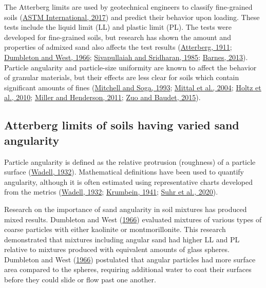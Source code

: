 \documentclass[
  letterpaper,
]{article}
\begin{document}
The Atterberg limits are used by geotechnical engineers to classify fine-grained soils (\protect\hyperlink{ref-ASTMInternational2017}{ASTM International, 2017}) and predict their behavior upon loading.
These tests include the liquid limit (LL) and plastic limit (PL).
The tests were developed for fine-grained soils, but research has shown the amount and properties of admixed sand also affects the test results (\protect\hyperlink{ref-Atterberg1911}{Atterberg, 1911}; \protect\hyperlink{ref-Dumbleton1966b}{Dumbleton and West, 1966}; \protect\hyperlink{ref-Sivapullaiah1985}{Sivapullaiah and Sridharan, 1985}; \protect\hyperlink{ref-Barnes2013}{Barnes, 2013}).
Particle angularity and particle-size uniformity are known to affect the behavior of granular materials, but their effects are less clear for soils which contain significant amounts of fines (\protect\hyperlink{ref-Mitchell1993}{Mitchell and Soga, 1993}; \protect\hyperlink{ref-Mittal2004}{Mittal et al., 2004}; \protect\hyperlink{ref-Holtz2010}{Holtz et al., 2010}; \protect\hyperlink{ref-Miller2011}{Miller and Henderson, 2011}; \protect\hyperlink{ref-Zuo2015}{Zuo and Baudet, 2015}).

\hypertarget{atterberg-limits-of-soils-having-varied-sand-angularity}{%
\subsection{Atterberg limits of soils having varied sand angularity}\label{atterberg-limits-of-soils-having-varied-sand-angularity}}

Particle angularity is defined as the relative protrusion (roughness) of a particle surface (\protect\hyperlink{ref-Wadell1932}{Wadell, 1932}).
Mathematical definitions have been used to quantify angularity, although it is often estimated using representative charts developed from the metrics (\protect\hyperlink{ref-Wadell1932}{Wadell, 1932}; \protect\hyperlink{ref-Krumbein1941}{Krumbein, 1941}; \protect\hyperlink{ref-Suhr2020}{Suhr et al., 2020}).

Research on the importance of sand angularity in soil mixtures has produced mixed results.
Dumbleton and West (\protect\hyperlink{ref-Dumbleton1966b}{1966}) evaluated mixtures of various types of coarse particles with either kaolinite or montmorillonite.
This research demonstrated that mixtures including angular sand had higher LL and PL relative to mixtures produced with equivalent amounts of glass spheres.
Dumbleton and West (\protect\hyperlink{ref-Dumbleton1966b}{1966}) postulated that angular particles had more surface area compared to the spheres, requiring additional water to coat their surfaces before they could slide or flow past one another.
\end{document}
